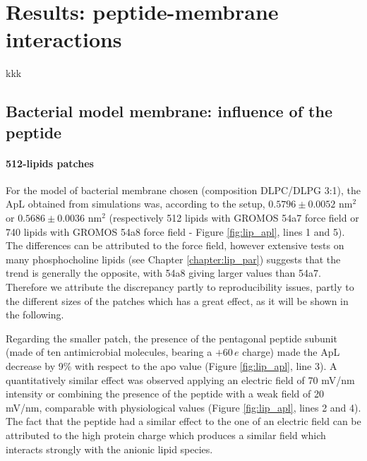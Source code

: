 \section{Results: peptide-membrane interactions}

kkk

\subsection{Bacterial model membrane: influence of the peptide}

\paragraph{512-lipids patches} For the model of bacterial membrane chosen (composition DLPC/DLPG 3:1), the ApL obtained from simulations was, according to the setup, $0.5796\pm0.0052$ nm$^2$ or $0.5686\pm0.0036$ nm$^2$ (respectively 512 lipids with GROMOS 54a7 force field or 740 lipids with GROMOS 54a8 force field - Figure \ref{fig:lip_apl}, lines 1 and 5).
%
The differences can be attributed to the force field, however extensive tests on many phosphocholine lipids (see Chapter \ref{chapter:lip_par}) suggests that the trend is generally the opposite, with 54a8 giving larger values than 54a7.
%
Therefore we attribute the discrepancy partly to reproducibility issues, partly to the different sizes of the patches which has a great effect, as it will be shown in the following.

Regarding the smaller patch, the presence of the pentagonal peptide subunit (made of ten antimicrobial molecules, bearing a $+60\,e$ charge) made the ApL decrease by 9\% with respect to the apo value (Figure \ref{fig:lip_apl}, line 3).
%
A quantitatively similar effect was observed applying an electric field of 70 mV/nm intensity or combining the presence of the peptide with a weak field of 20 mV/nm, comparable with physiological values (Figure \ref{fig:lip_apl}, lines 2 and 4).
%
The fact that the peptide had a similar effect to the one of an electric field can be attributed to the high protein charge which produces a similar field which interacts strongly with the anionic lipid species.

